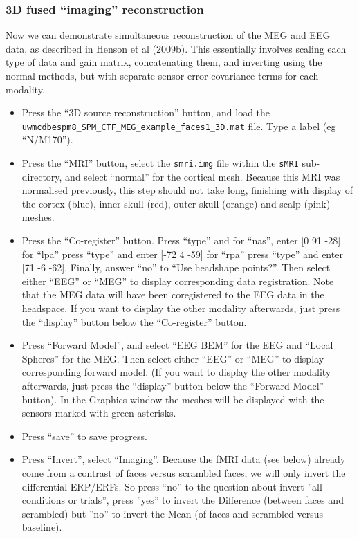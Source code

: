 \subsubsection{3D fused ``imaging'' reconstruction \label{multimodal:fusion:eegmeg:3D}}

Now we can demonstrate simultaneous reconstruction of the MEG and EEG data, as described in Henson et al (2009b). This essentially involves scaling each type of data and gain matrix, concatenating them, and inverting using the normal methods, but with separate sensor error covariance terms for each modality.
\begin{itemize}
\item Press the ``3D source reconstruction'' button, and load the \texttt{uwmcdbespm8\_\-SPM\_\-CTF\_\-MEG\_\-example\_\-faces1\_\-3D.mat} file. Type a label (eg ``N/M170'').

\item Press the ``MRI'' button, select the \texttt{smri.img} file within the \texttt{sMRI} sub-directory, and select ``normal'' for the cortical mesh. Because this MRI was normalised previously, this step should not take long, finishing with display of the cortex (blue), inner skull (red), outer skull (orange) and scalp (pink) meshes.

\item Press the ``Co-register'' button. Press ``type'' and for ``nas'', enter [0 91 -28] for ``lpa'' press ``type'' and enter [-72 4 -59] for ``rpa'' press ``type'' and enter [71 -6 -62]. Finally, answer ``no'' to ``Use headshape points?''. Then select either ``EEG'' or ``MEG'' to display corresponding
data registration. Note that the MEG data will have been coregistered to the EEG data in the headspace. If you want to display the other modality afterwards, just press the ``display'' button below the ``Co-register'' button.

\item Press ``Forward Model'', and select ``EEG BEM'' for the EEG and ``Local Spheres'' for the MEG. Then select either ``EEG'' or ``MEG'' to display corresponding forward model. (If you want to display the other modality afterwards, just press the ``display'' button below the ``Forward Model'' button). In the Graphics window the meshes will be displayed with the sensors marked with green asterisks.

\item Press ``save'' to save progress.

\item Press ``Invert'', select ``Imaging''. Because the fMRI data (see below) already come from a contrast of faces versus scrambled faces, we will only invert the differential ERP/ERFs. So press ``no'' to the question about invert ''all conditions or trials'', press ''yes'' to invert the Difference (between faces and scrambled) but ''no'' to invert the Mean (of faces and scrambled versus baseline). 


\end{itemize}
